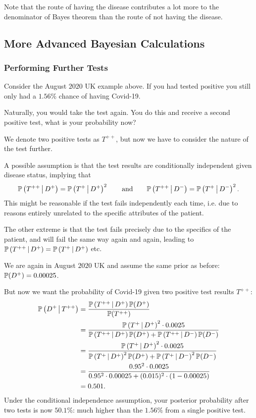 \documentclass[10pt, a4paper]{article}
\begin{document}
Note that the route of having the disease contributes a lot more to the denominator of Bayes theorem than the route of not having the disease.

\subsection{More Advanced Bayesian Calculations}

\subsubsection{Performing Further Tests}
Consider the August $2020$ UK example above.
If you had tested positive you still only had a $1.56\%$ chance of having Covid-19.

Naturally,
you would take the test again.
You do this and receive a second positive test,
what is your probability now?

We denote two positive tests as $T ^ {++}$,
but now we have to consider the nature of the test further.

A possible assumption is that the test results are conditionally independent given disease status,
implying that
\[
\P\left(T ^ {++} \mmid D ^ {+}\right) = \P\left(T ^ {+} \mmid D ^ {+}\right) ^ 2\qquad\text{and}\qquad\P\left(T ^ {++} \mmid D ^ {-}\right) = \P\left(T ^ {+} \mmid D ^ {-}\right) ^ 2.
\]
This might be reasonable if the test fails independently each time,
i.e. due to reasons entirely unrelated to the specific attributes of the patient.

The other extreme is that the test fails precisely due to the specifics of the patient,
and will fail the same way again and again,
leading to $\P\left(T ^ {++} \mmid D ^ {+}\right) = \P\left(T ^ {+}\mmid D ^ {+}\right)$ etc.

\begin{example}
    We are again in August $2020$ UK and assume the same prior as before:
    $\P(D ^ {+}) = 0.00025$.

    But now we want the probability of Covid-19 given two positive test results $T ^ {++}$:
    \begin{align*}
        \P\left(D ^ {+} \mmid T ^ {++}\right) &= \frac{\P\left(T ^ {++} \mmid D ^ {+}\right)\P(D ^ {+})}{\P(T ^ {++})} \\
        &= \frac{\P\left(T ^ {+} \mmid D ^ {+}\right) ^ 2 \cdot 0.0025}{\P\left(T ^ {++} \mmid D ^ {+}\right)\P(D ^ {+}) + \P\left(T ^ {++} \mmid D ^ {-}\right)\P(D ^ {-})} \\
        &= \frac{\P\left(T ^ {+} \mmid D ^ {+}\right) ^ 2 \cdot 0.0025}{\P\left(T ^ {+} \mmid D ^ {+}\right) ^ 2\P(D ^ {+}) + \P\left(T ^ {+} \mmid D ^ {-}\right) ^ 2\P(D ^ {-})} \\
        &= \frac{0.95 ^ 2 \cdot 0.0025}{0.95 ^ 2 \cdot 0.00025 + (0.015) ^ 2 \cdot (1 - 0.00025)} \\
        &= 0.501.
    \end{align*}
    Under the conditional independence assumption,
    your posterior probability after two tests is now $50.1\%$:
    much higher than the $1.56\%$ from a single positive test.
\end{example}
\end{document}
